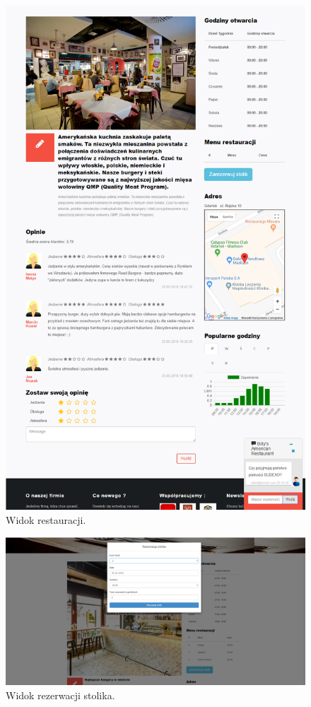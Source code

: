 \documentclass{article}
\begin{document}
\begin{figure}[H]
\centering
	\includegraphics[width=1.00\textwidth]{screens/restaurant.png}
	\caption{Widok restauracji.}
	\label{fig:restaurant}
\end{figure}

\begin{figure}[H]
\centering
	\includegraphics[width=1.00\textwidth]{screens/reservation.png}
	\caption{Widok rezerwacji stolika.}
	\label{fig:reservation}
\end{figure}
\end{document}
